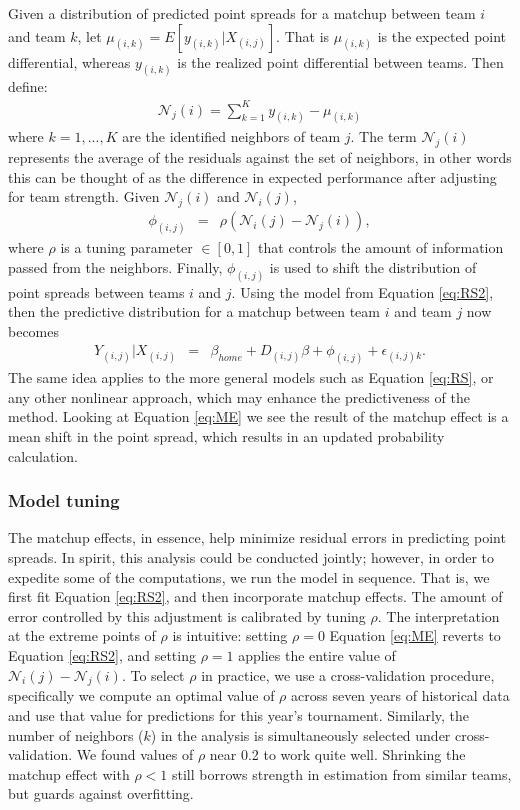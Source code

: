 \documentclass[letterpaper,12pt]{article}
\begin{document}
Given a distribution of predicted point spreads for a matchup between team $i$ and team $k$, let $\mu_{(i,k)} = E[y_{(i,k)}|X_{(i,j)}]$. That is $\mu_{(i,k)}$ is the expected point differential, whereas $y_{(i,k)}$ is the realized point differential between teams. Then define:
\begin{eqnarray*}
\mathcal{N}_j(i) = \sum_{k=1}^K y_{(i,k)} - \mu_{(i,k)}
\end{eqnarray*}
where $k = 1,...,K$ are the identified neighbors of team $j$. The term $\mathcal{N}_j(i)$ represents the average of the residuals against the set of neighbors, in other words this can be thought of as the difference in expected performance after adjusting for team strength. Given $\mathcal{N}_j(i)$ and $\mathcal{N}_i(j)$,
\begin{eqnarray*}
\phi_{(i,j)} &=& \rho(\mathcal{N}_i(j) -\mathcal{N}_j(i)),
\end{eqnarray*}
where $\rho$ is a tuning parameter $\in [0,1]$ that controls the amount of information passed from the neighbors. Finally, $\phi_{(i,j)}$ is used to shift the distribution of point spreads between teams $i$ and $j$. Using the model from Equation \ref{eq:RS2}, then the predictive distribution for a matchup between team $i$ and team $j$ now becomes
\begin{eqnarray}
Y_{(i,j)}|X_{(i,j)} &=& \beta_{home} +  D_{(i,j)}\beta + \phi_{(i,j)} +  \epsilon_{(i,j)k} \label{eq:ME}.
\end{eqnarray}
The same idea applies to the more general models such as Equation \ref{eq:RS}, or any other nonlinear approach, which may enhance the predictiveness of the method. Looking at Equation \ref{eq:ME} we see the result of the matchup effect is a mean shift in the point spread, which results in an updated probability calculation.

\subsubsection{Model tuning\label{sec:tuning}}
The matchup effects, in essence, help minimize residual errors in predicting point spreads. In spirit, this analysis could be conducted jointly; however, in order to expedite some of the computations, we run the model in sequence. That is, we first fit Equation \ref{eq:RS2}, and then incorporate matchup effects. The amount of error controlled by this adjustment is calibrated by tuning $\rho$. 
The interpretation at the extreme points of $\rho$ is intuitive: setting $\rho = 0$ Equation \ref{eq:ME} reverts to Equation \ref{eq:RS2}, and setting $\rho = 1$ applies the entire value of $\mathcal{N}_i(j) -\mathcal{N}_j(i)$. To select $\rho$ in practice, we use a cross-validation procedure, specifically we compute an optimal value of $\rho$ across seven years of historical data and use that value for predictions for this year's tournament. Similarly, the number of neighbors ($k$) in the analysis is simultaneously selected under cross-validation. We found values of $\rho$ near 0.2 to work quite well. Shrinking the matchup effect with $\rho <1$ still borrows strength in estimation from similar teams, but guards against overfitting.
\end{document}

